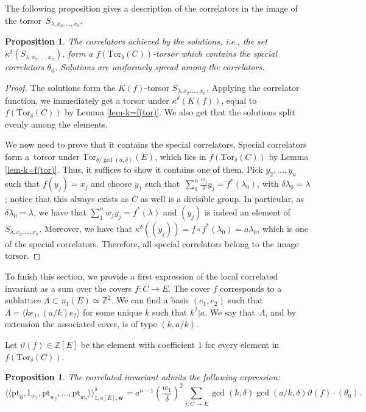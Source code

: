 \documentclass[pdftex]{sigma}
\newcommand{\Tor}{\mathrm{Tor}}
\newcommand{\pt}{\mathrm{pt}}
\newcommand{\ZZ}{\mathbb{Z}}
\newcommand{\bfw}{ {\boldsymbol w} }
\numberwithin{equation}{section}
\newtheorem{prop}[theo]{Proposition}
\theoremstyle{definition}
\begin{document}
The following proposition gives a description of the correlators in the image of the torsor~$S_{\lambda,x_2,\dots,x_n}$.

\begin{prop}\label{prop-solution-torsor}
The correlators achieved by the solutions, i.e., the set $\kappa^{\delta}(S_{\lambda,x_2,\dots,x_n})$, form a $f(\Tor_\delta(C))$-torsor which contains the special correlators $\theta_0$. Solutions are uniformely spread among the correlators.
\end{prop}

\begin{proof}
 The solutions form the $K(f)$-torsor $S_{\lambda,x_2,\dots,x_n}$. Applying the correlator function, we immediately get a torsor under $\kappa^\delta(K(f))$, equal to $f(\Tor_\delta(C))$ by Lemma \ref{lem-k=f(tor)}. We also get that the solutions split evenly among the elements.

 We now need to prove that it contains the special correlators. Special correlators form a~torsor under $\Tor_{\delta/\gcd(a,\delta)}(E)$, which lies in $f(\Tor_\delta(C))$ by Lemma \ref{lem-k=f(tor)}. Thus, it suffices to show it contains one of them.
 Pick $y_2,\dots,y_n$ such that $f(y_j)=x_j$ and choose $y_1$ such that~${\sum_1^n\frac{w_j}{\delta}y_j=f^*(\lambda_0)}$, with $\delta\lambda_0=\lambda$; notice that this always exists as $C$ as well is a divisible group. In particular, as $\delta\lambda_0=\lambda$, we have that $\sum_1^n w_jy_j=f^*(\lambda)$ and $(y_j)$ is indeed an element of $S_{\lambda,x_2,\dots,x_n}$. Moreover, we have that
$\kappa^\delta((y_j))=f\circ f^*(\lambda_0)=a\lambda_0$,
 which is one of the special correlators. Therefore, all special correlators belong to the image torsor.
\end{proof}

To finish this section, we provide a first expression of the local correlated invariant as a sum over the covers $f\colon C\to E$. The cover $f$ corresponds to a sublattice $\Lambda\subset\pi_1(E)\simeq\ZZ^2$. We can find a basis $(e_1,e_2)$ such that $\Lambda=\langle ke_1,(a/k)e_2\rangle$ for some unique $k$ such that $k^2|a$. We say that~$\Lambda$, and by extension the associated cover, is of type $(k,a/k)$.

Let $\vartheta(f)\in\ZZ[E]$ be the element with coefficient $1$ for every element in $f(\Tor_\delta(C))$.

\begin{prop}\label{prop-first-expression-local-correlated-inv}
 The correlated invariant admits the following expression:
 \[ \langle\langle\pt_0,1_{w_1},\pt_{w_2},\dots,\pt_{w_n} \rangle\rangle^\delta_{1,a[E],\bfw} = a^{n-1}\left(\frac{w_1}{\delta}\right)^2\sum_{f\colon C\to E} \gcd(k,\delta)\gcd(a/k,\delta) \vartheta(f)\cdot (\theta_0). \]
\end{prop}
\end{document}
